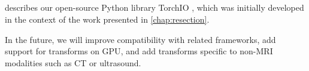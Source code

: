 \subsection{}

 describes our open-source Python library TorchIO \cite{perez-garcia_torchio_2021}, which was initially developed in the context of the work presented in \cref{chap:resection}.


In the future, we will improve compatibility with related frameworks, add support for transforms on \ac{GPU}, and add transforms specific to non-\ac{MRI} modalities such as \acs{CT} or ultrasound.
